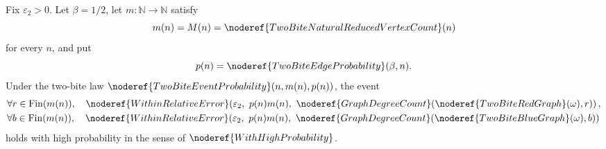 \begin{helper}
Fix \(\varepsilon_2>0\).  Let \(\beta=1/2\), let
\(m:\mathbb N\to\mathbb N\) satisfy
\[
m(n)=M(n)=\noderef{TwoBiteNaturalReducedVertexCount}(n)
\]
for every \(n\), and put
\[
p(n)=\noderef{TwoBiteEdgeProbability}(\beta,n).
\]
Under the two-bite law
\(\noderef{TwoBiteEventProbability}(n,m(n),p(n))\), the event
\[
\begin{aligned}
&\forall r\in \operatorname{Fin}(m(n)),\quad
\noderef{WithinRelativeError}\!\left(
  \varepsilon_2,\ p(n)m(n),\
  \noderef{GraphDegreeCount}(\noderef{TwoBiteRedGraph}(\omega),r)
\right),\\
&\forall b\in \operatorname{Fin}(m(n)),\quad
\noderef{WithinRelativeError}\!\left(
  \varepsilon_2,\ p(n)m(n),\
  \noderef{GraphDegreeCount}(\noderef{TwoBiteBlueGraph}(\omega),b)
\right)
\end{aligned}
\]
holds with high probability in the sense of \(\noderef{WithHighProbability}\).
\end{helper}
